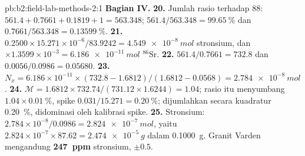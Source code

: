\begin{solution}{pb:b2:field-lab-methods-2:1}
\noindent\textbf{Bagian IV.}
\textbf{20.} Jumlah rasio terhadap 88: $561.4 + 0.7661 + 0.1819 + 1 = 563.348$; $561.4/563.348 =
\qty{99.65}{\percent}$ dan $0.7661/563.348 = \qty{0.13599}{\percent}$.
\textbf{21.} $0.2500 \times 15.271 \times 10^{-6}/83.9242 = \qty{4.549e-8}{mol}$ stronsium, dan
$\times 1.3599 \times 10^{-3} = \qty{6.186e-11}{mol}$ $^{86}\mathrm{Sr}$.
\textbf{22.} $561.4/0.7661 = 732.8$ dan $0.0056/0.0986 = 0.05680$.
\textbf{23.} $N_x = 6.186 \times 10^{-11} \times (732.8 - 1.6812)/(1.6812 - 0.0568) =
\qty{2.784e-8}{mol}$.
\textbf{24.} $\mathcal M = 1.6812 \times 732.74/(731.12 \times 1.6244) = 1.04$; rasio itu menyumbang
$1.04 \times \qty{0.01}{\percent}$, spike $0.031/15.271 = \qty{0.20}{\percent}$; dijumlahkan secara kuadratur
\qty{0.20}{\percent}, didominasi oleh kalibrasi spike.
\textbf{25.} Stronsium: $2.784 \times 10^{-8}/0.0986 = \qty{2.824e-7}{mol}$, yaitu $2.824 \times
10^{-7} \times 87.62 = \qty{2.474e-5}{g}$ dalam \qty{0.1000}{g}. Granit Varden mengandung
\textbf{\qty[text-series-to-math=true]{247}{ppm}} stronsium, $\pm 0.5$.
\end{solution}
